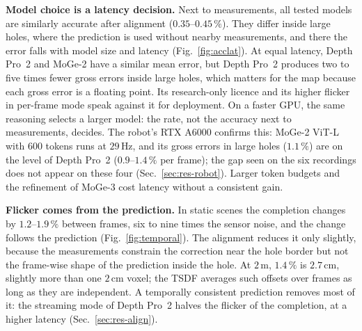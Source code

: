 \documentclass[conference]{IEEEtran}
\begin{document}
\textbf{Model choice is a latency decision.} Next to measurements, all tested
models are similarly accurate after alignment (\(0.35\)--\(0.45\,\%\)). They
differ inside large holes, where the prediction is used without nearby
measurements, and there the error falls with model size and latency
(Fig.~\ref{fig:acclat}). At equal latency, Depth Pro~2 and MoGe-2 have a similar
mean error, but Depth Pro~2 produces two to five times fewer gross errors
inside large holes, which matters for the map because each gross error is a
floating point. Its research-only licence and its higher flicker in per-frame
mode speak against it for deployment. On a faster GPU, the same reasoning selects a
larger model: the rate, not the accuracy next to measurements, decides. The robot's
RTX A6000 confirms this: MoGe-2 ViT-L with \(600\) tokens runs at \(29\,\)Hz,
and its gross errors in large holes (\(1.1\,\%\)) are on the level of Depth Pro~2
(\(0.9\)--\(1.4\,\%\) per frame); the gap seen on the six recordings does not
appear on these four (Sec.~\ref{sec:res-robot}).
Larger token budgets and the refinement of MoGe-3 cost latency without a
consistent gain.

\textbf{Flicker comes from the prediction.} In static scenes the completion
changes by \(1.2\)--\(1.9\,\%\) between frames, six to nine times the sensor
noise, and the change follows the prediction (Fig.~\ref{fig:temporal}). The
alignment reduces it only slightly, because the measurements constrain the
correction near the hole border but not the frame-wise shape of the prediction
inside the hole. At \(2\,\)m, \(1.4\,\%\) is \(2.7\,\)cm, slightly more than one
\(2\,\)cm voxel; the TSDF averages such offsets over frames as long as they are
independent. A temporally consistent prediction removes most of it: the
streaming mode of Depth Pro~2 halves the flicker of the completion, at a
higher latency (Sec.~\ref{sec:res-align}).
\end{document}
